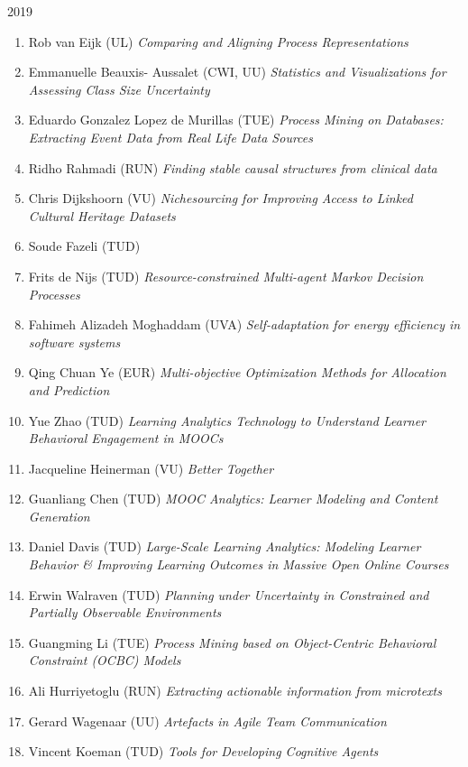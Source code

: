 \begin{multicols}{2}
\begin{scriptsize}
\vspace{0.2cm}
2019
\vspace{0.2cm}
\begin{enumerate}[leftmargin=*,noitemsep,topsep=0pt,parsep=1pt,partopsep=0pt]
\renewcommand{\labelenumi}{2019-\arabic{enumi}}
\item Rob van Eijk (UL)	\textit{Comparing and Aligning Process Representations}
\item Emmanuelle Beauxis- Aussalet (CWI, UU) \textit{Statistics and Visualizations for Assessing Class Size Uncertainty}
\item Eduardo Gonzalez Lopez de Murillas (TUE) \textit{Process Mining on Databases: Extracting Event Data from Real Life Data Sources}
\item Ridho Rahmadi (RUN) \textit{Finding stable causal structures from clinical data}
\item Chris Dijkshoorn (VU) \textit{Nichesourcing for Improving Access to Linked Cultural Heritage Datasets}
\item Soude Fazeli (TUD)
\item Frits de Nijs (TUD) \textit{Resource-constrained Multi-agent Markov Decision Processes}
\item Fahimeh Alizadeh Moghaddam (UVA) \textit{Self-adaptation for energy efficiency in software systems}
\item Qing Chuan Ye (EUR) \textit{Multi-objective Optimization Methods for Allocation and Prediction}
\item Yue Zhao (TUD) \textit{Learning Analytics Technology to Understand Learner Behavioral Engagement in MOOCs}
\item Jacqueline Heinerman (VU) \textit{Better Together}
\item Guanliang Chen (TUD) \textit{MOOC Analytics: Learner Modeling and Content Generation}
\item Daniel Davis (TUD) \textit{Large-Scale Learning Analytics: Modeling Learner Behavior \& Improving Learning Outcomes in Massive Open Online Courses}
\item Erwin Walraven (TUD) \textit{Planning under Uncertainty in Constrained and Partially Observable Environments}
\item Guangming Li (TUE) \textit{Process Mining based on Object-Centric Behavioral Constraint (OCBC) Models}
\item Ali Hurriyetoglu (RUN) \textit{Extracting actionable information from microtexts}
\item Gerard Wagenaar (UU) \textit{Artefacts in Agile Team Communication}
\item Vincent Koeman (TUD) \textit{Tools for Developing Cognitive Agents}
\end{enumerate}



\end{scriptsize}
\end{multicols}
\restoregeometry